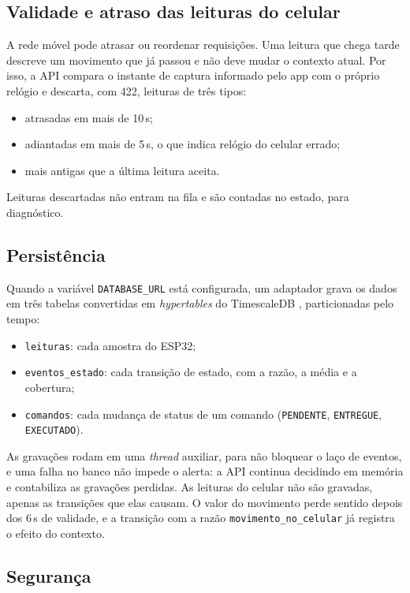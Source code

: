 \documentclass[12pt,a4paper]{article}
\begin{document}
\subsection{Validade e atraso das leituras do celular}

A rede móvel pode atrasar ou reordenar requisições.
Uma leitura que chega tarde descreve um movimento que já passou e não deve mudar o contexto atual.
Por isso, a API compara o instante de captura informado pelo app com o próprio relógio e descarta, com 422, leituras de três tipos:
\begin{itemize}
  \item atrasadas em mais de 10\,s;
  \item adiantadas em mais de 5\,s, o que indica relógio do celular errado;
  \item mais antigas que a última leitura aceita.
\end{itemize}
Leituras descartadas não entram na fila e são contadas no estado, para diagnóstico.

\subsection{Persistência}

Quando a variável \texttt{DATABASE\_URL} está configurada, um adaptador grava os dados em três tabelas convertidas em \emph{hypertables} do TimescaleDB \cite{timescale}, particionadas pelo tempo:
\begin{itemize}
  \item \texttt{leituras}: cada amostra do ESP32;
  \item \texttt{eventos\_estado}: cada transição de estado, com a razão, a média e a cobertura;
  \item \texttt{comandos}: cada mudança de status de um comando (\texttt{PENDENTE}, \texttt{ENTREGUE}, \texttt{EXECUTADO}).
\end{itemize}
As gravações rodam em uma \emph{thread} auxiliar, para não bloquear o laço de eventos, e uma falha no banco não impede o alerta: a API continua decidindo em memória e contabiliza as gravações perdidas.
As leituras do celular não são gravadas, apenas as transições que elas causam.
O valor do movimento perde sentido depois dos 6\,s de validade, e a transição com a razão \texttt{movimento\_no\_celular} já registra o efeito do contexto.

\subsection{Segurança}
\end{document}
